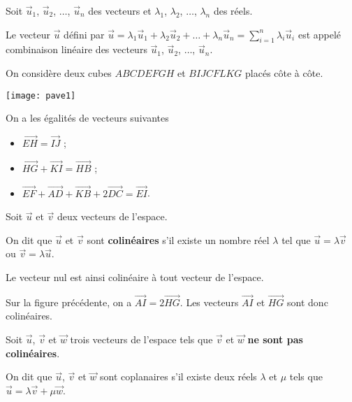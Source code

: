 \documentclass[11pt,fleqn, openany]{book} %
\begin{document}
\begin{definition} Soit $\vec u_1$, $ \vec u_2$, $\ldots$, $\vec u_n$ des vecteurs et $\lambda_1$, $\lambda_2$, $\ldots$, $\lambda_n$ des réels.

Le vecteur $\vec u$ défini par $\vec u = \lambda_1 \vec u_1 + \lambda_2 \vec u_2 + \ldots + \lambda_n \vec u_n = \displaystyle\sum_{i=1}^n \lambda_i \vec u_i$ est appelé combinaison linéaire des vecteurs $\vec u_1$, $\vec u_2$, $\ldots$, $\vec u_n$.\end{definition}
\begin{example}
On considère deux cubes $ABCDEFGH$ et $BIJCFLKG$ placés côte à côte.

\begin{minipage}{0.4\linewidth}
\texttt{[image: pave1]}

\end{minipage}\begin{minipage}{0.55 \linewidth}
 On a les égalités de vecteurs suivantes
\begin{itemize}
\item $\overrightarrow{EH} = \overrightarrow{IJ}$ ;
\item $\overrightarrow{HG}+\overrightarrow{KI}= \overrightarrow{HB}$ ;
\item $\overrightarrow{EF}+\overrightarrow{AD}+\overrightarrow{KB}+2\overrightarrow{DC}=\overrightarrow{EI}$.
\end{itemize}
\end{minipage}

\end{example}


\begin{definition}Soit $\vec u$ et $\vec v$ deux vecteurs de l'espace.

On dit que $\vec u$ et $\vec v$ sont \textbf{colinéaires} s'il existe un nombre réel $\lambda$ tel que $\vec u = \lambda \vec v$ ou $\vec v = \lambda \vec u$.\end{definition}

Le vecteur nul est ainsi colinéaire à tout vecteur de l'espace.

\begin{example}Sur la figure précédente, on a $\overrightarrow{AI}=2\overrightarrow{HG}$. Les vecteurs $\overrightarrow{AI}$ et $\overrightarrow{HG}$ sont donc colinéaires.\end{example}

\newpage

\begin{definition}Soit $\vec u$, $\vec v$ et $\vec w$ trois vecteurs de l'espace tels que $\vec v$ et $\vec w$ \textbf{ne sont pas colinéaires}. 

On dit que $\vec u$, $\vec v$ et $\vec w$ sont coplanaires s'il existe deux réels $\lambda$ et $\mu$ tels que $\vec u = \lambda \vec v+ \mu \vec w$.\end{definition}
\end{document}
